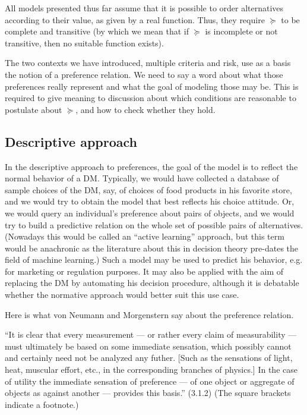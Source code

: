 \documentclass[french, english]{llncs}
\begin{document}
	
	All models presented thus far assume that it is possible to order alternatives according to their value, as given by a real function. Thus, they require $\succeq$ to be complete and transitive (by which we mean that if $\succeq$ is incomplete or not transitive, then no suitable function exists).
	
	The two contexts we have introduced, multiple criteria and risk, use as a basis the notion of a preference relation. We need to say a word about what those preferences really represent and what the goal of modeling those may be. This is required to give meaning to discussion about which conditions are reasonable to postulate about $\succeq$, and how to check whether they hold.
	
	\subsection{Descriptive approach}
	In the descriptive approach to preferences, the goal of the model is to reflect the normal behavior of a \ac{DM}. Typically, we would have collected a database of sample choices of the \ac{DM}, say, of choices of food products in his favorite store, and we would try to obtain the model that best reflects his choice attitude. Or, we would query an individual’s preference about pairs of objects, and we would try to build a predictive relation on the whole set of possible pairs of alternatives. (Nowadays this would be called an “active learning” approach, but this term would be anachronic as the literature about this in decision theory pre-dates the field of machine learning.) Such a model may be used to predict his behavior, e.g. for marketing or regulation purposes. It may also be applied with the aim of replacing the \ac{DM} by automating his decision procedure, although it is debatable whether the normative approach would better suit this use case.
	
	Here is what von Neumann and Morgenstern say about the preference relation.
	
	“It is clear that every measurement --- or rather every claim of measurability --- must ultimately be based on some immediate sensation, which possibly cannot and certainly need not be analyzed any futher.
	[Such as the sensations of light, heat, muscular effort, etc., in the corresponding branches of physics.] 
	In the case of utility the immediate sensation of preference --- of one object or aggregate of objects as against another --- provides this basis.” (3.1.2) (The square brackets indicate a footnote.)
	
\end{document}
